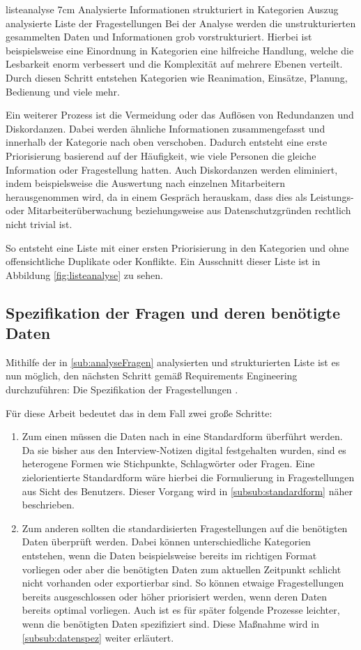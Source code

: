 \bildrechts
{listeanalyse}
{7cm}
{Analysierte Informationen strukturiert in Kategorien}
{Auszug analysierte Liste der Fragestellungen}
Bei der Analyse werden die unstrukturierten gesammelten Daten und Informationen grob vorstrukturiert.
Hierbei ist beispielsweise eine Einordnung in Kategorien eine hilfreiche Handlung, welche die Lesbarkeit enorm verbessert und die Komplexität auf mehrere Ebenen verteilt.
Durch diesen Schritt entstehen Kategorien wie Reanimation, Einsätze, Planung, Bedienung und viele mehr.

Ein weiterer Prozess ist die Vermeidung oder das Auflösen von Redundanzen und Diskordanzen.
Dabei werden ähnliche Informationen zusammengefasst und innerhalb der Kategorie nach oben verschoben.
Dadurch entsteht eine erste Priorisierung basierend auf der Häufigkeit, wie viele Personen die gleiche Information oder Fragestellung hatten.
Auch Diskordanzen werden eliminiert, indem beispielsweise die Auswertung nach einzelnen Mitarbeitern herausgenommen wird, da in einem Gespräch herauskam, dass dies als Leistungs- oder Mitarbeiterüberwachung beziehungsweise aus Datenschutzgründen rechtlich nicht trivial ist.

So entsteht eine Liste mit einer ersten Priorisierung in den Kategorien und ohne offensichtliche Duplikate oder Konflikte.
Ein Ausschnitt dieser Liste ist in Abbildung \ref{fig:listeanalyse} zu sehen.
\clearpage
\subsection{Spezifikation der Fragen und deren benötigte Daten}
\label{sub:spezifikation}
Mithilfe der in \ref{sub:analyseFragen} analysierten und strukturierten Liste ist es nun möglich, den nächsten Schritt gemäß Requirements Engineering durchzuführen: Die Spezifikation der Fragestellungen \cite{Pohl.2011}.

Für diese Arbeit bedeutet das in dem Fall zwei große Schritte: 
\begin{enumerate}
\item Zum einen müssen die Daten nach \cite{Patig.} in eine Standardform überführt werden. 
Da sie bisher aus den Interview-Notizen digital festgehalten wurden, sind es heterogene Formen wie Stichpunkte, Schlagwörter oder Fragen.
Eine zielorientierte Standardform wäre hierbei die Formulierung in Fragestellungen aus Sicht des Benutzers.
Dieser Vorgang wird in \ref{subsub:standardform} näher beschrieben.
\item Zum anderen sollten die standardisierten Fragestellungen auf die benötigten Daten überprüft werden.
Dabei können unterschiedliche Kategorien entstehen, wenn die Daten beispielsweise bereits im richtigen Format vorliegen oder aber die benötigten Daten zum aktuellen Zeitpunkt schlicht nicht vorhanden oder exportierbar sind.
So können etwaige Fragestellungen bereits ausgeschlossen oder höher priorisiert werden, wenn deren Daten bereits optimal vorliegen.
Auch ist es für später folgende Prozesse leichter, wenn die benötigten Daten spezifiziert sind.
Diese Maßnahme wird in \ref{subsub:datenspez} weiter erläutert.
\end{enumerate}

